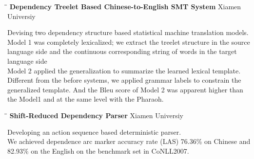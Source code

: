 \documentclass{res}
\begin{document}
\begin{resume}
\begin{tabbing}
   \hspace{2.3in}\= \hspace{2.6in}\= \kill %
    {\bf Dependency Treelet Based Chinese-to-English SMT System} \> \>Xiamen Universiy\\
   \end{tabbing}\vspace{-20pt}      %
   Devising two dependency structure based statistical machine translation models. \\
   Model 1 was completely lexicalized; we extract the treelet structure in the source language side and the continuous corresponding string of words in the target language side\\
   Model 2 applied the generalization to summarize the learned lexical template. Different from the before systems, we applied grammar labels to constrain the generalized template. And the Bleu score of Model 2 was apparent higher than the Model1 and at the same level with the Pharaoh.
   \begin{tabbing}
   \hspace{2.3in}\= \hspace{2.6in}\= \kill %
    {\bf Shift-Reduced Dependency Parser} \> \>Xiamen Universiy\\
   \end{tabbing}\vspace{-20pt}      %
   Developing an action sequence based deterministic parser.\\
   We achieved dependence arc marker accuracy rate (LAS) 76.36\% on Chinese and 82.93\% on the English on the benchmark set in CoNLL2007.
\end{resume}
\end{document}
